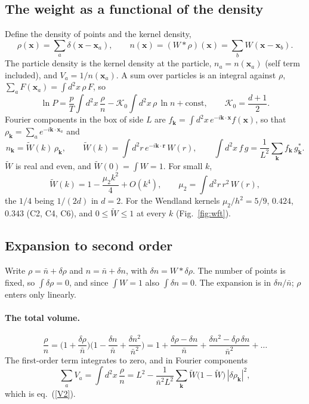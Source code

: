 \documentclass[11pt,aps,preprint,nofootinbib,superscriptaddress,tightenlines]{revtex4-2}
\def\st{\begin{equation}}
\def\stp{\end{equation}}
\def\Eq#1{eq.~(\ref{#1})}
\def\Fig#1{Fig.~\ref{#1}}
\let\oldparagraph\paragraph
\renewcommand{\paragraph}{\par\bigskip\oldparagraph}
\begin{document}
\subsection{The weight as a functional of the density}
\label{app:functional}

Define the density of points and the kernel density,
\st
\rho(\bm x)=\sum_a\delta(\bm x-\bm x_a),\qquad n(\bm x)=(W*\rho)(\bm x)=\sum_bW(\bm x-\bm x_b) .
\stp
The particle density is the kernel density at the particle, $n_a=n(\bm x_a)$ (self term included), and $V_a=1/n(\bm x_a)$.  A sum over
particles is an integral against $\rho$, $\sum_aF(\bm x_a)=\int d^2x\,\rho\,F$, so
\st
\ln P=\frac pT\int d^2x\,\frac{\rho}{n}-\mathcal K_0\int d^2x\,\rho\,\ln n+\text{const},\qquad \mathcal K_0=\frac{d+1}2 .
\label{lnP}
\stp
Fourier components in the box of side $L$ are $f_{\bm k}=\int d^2x\,e^{-i\bm k\cdot\bm x}f(\bm x)$, so that $\rho_{\bm k}=\sum_ae^{-i\bm k\cdot\bm x_a}$ and
\st
n_{\bm k}=\widetilde W(k)\,\rho_{\bm k},\qquad \widetilde W(k)=\int d^2r\,e^{-i\bm k\cdot\bm r}\,W(r),\qquad
\int d^2x\,f\,g=\frac1{L^2}\sum_{\bm k}f_{\bm k}\,g_{\bm k}^* .
\stp
$\widetilde W$ is real and even, and $\widetilde W(0)=\int W=1$.  For small $k$,
\st
\widetilde W(k)=1-\frac{\mu_2k^2}{4}+O(k^4),\qquad \mu_2=\int d^2r\,r^2\,W(r),
\label{mu2}
\stp
the $1/4$ being $1/(2d)$ in $d=2$.  For the Wendland kernels $\mu_2/h^2=5/9$, $0.424$, $0.343$ (C2, C4, C6), and $0\le\widetilde W\le1$ at every $k$
(\Fig{fig:wft}).

\subsection{Expansion to second order}
\label{app:second}

Write $\rho=\bar n+\delta\rho$ and $n=\bar n+\delta n$, with $\delta n=W*\delta\rho$.  The number of points is fixed, so
$\int\delta\rho=0$, and since $\int W=1$ also $\int\delta n=0$.  The expansion is in $\delta n/\bar n$; $\rho$ enters only linearly.

\paragraph{The total volume.}
\st
\frac{\rho}{n}=\Big(1+\frac{\delta\rho}{\bar n}\Big)\Big(1-\frac{\delta n}{\bar n}+\frac{\delta n^2}{\bar n^2}\Big)
=1+\frac{\delta\rho-\delta n}{\bar n}+\frac{\delta n^2-\delta\rho\,\delta n}{\bar n^2}+\dots
\stp
The first-order term integrates to zero, and in Fourier components
\st
\sum_aV_a=\int d^2x\,\frac\rho n=L^2-\frac{1}{\bar n^2L^2}\sum_{\bm k}\widetilde W\big(1-\widetilde W\big)\,|\delta\rho_{\bm k}|^2 ,
\stp
which is \Eq{V2}.
\end{document}
